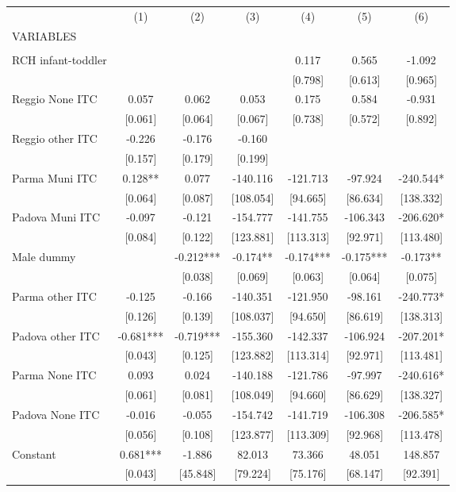 \begin{tabular}{lcccccc} \hline
 & (1) & (2) & (3) & (4) & (5) & (6) \\
VARIABLES &  &  &  &  &  &  \\ \hline
 &  &  &  &  &  &  \\
RCH infant-toddler &  &  &  & 0.117 & 0.565 & -1.092 \\
 &  &  &  & [0.798] & [0.613] & [0.965] \\
Reggio None ITC & 0.057 & 0.062 & 0.053 & 0.175 & 0.584 & -0.931 \\
 & [0.061] & [0.064] & [0.067] & [0.738] & [0.572] & [0.892] \\
Reggio other ITC & -0.226 & -0.176 & -0.160 &  &  &  \\
 & [0.157] & [0.179] & [0.199] &  &  &  \\
Parma Muni ITC & 0.128** & 0.077 & -140.116 & -121.713 & -97.924 & -240.544* \\
 & [0.064] & [0.087] & [108.054] & [94.665] & [86.634] & [138.332] \\
Padova Muni ITC & -0.097 & -0.121 & -154.777 & -141.755 & -106.343 & -206.620* \\
 & [0.084] & [0.122] & [123.881] & [113.313] & [92.971] & [113.480] \\
Male dummy &  & -0.212*** & -0.174** & -0.174*** & -0.175*** & -0.173** \\
 &  & [0.038] & [0.069] & [0.063] & [0.064] & [0.075] \\
Parma other ITC & -0.125 & -0.166 & -140.351 & -121.950 & -98.161 & -240.773* \\
 & [0.126] & [0.139] & [108.037] & [94.650] & [86.619] & [138.313] \\
Padova other ITC & -0.681*** & -0.719*** & -155.360 & -142.337 & -106.924 & -207.201* \\
 & [0.043] & [0.125] & [123.882] & [113.314] & [92.971] & [113.481] \\
Parma None ITC & 0.093 & 0.024 & -140.188 & -121.786 & -97.997 & -240.616* \\
 & [0.061] & [0.081] & [108.049] & [94.660] & [86.629] & [138.327] \\
Padova None ITC & -0.016 & -0.055 & -154.742 & -141.719 & -106.308 & -206.585* \\
 & [0.056] & [0.108] & [123.877] & [113.309] & [92.968] & [113.478] \\
Constant & 0.681*** & -1.886 & 82.013 & 73.366 & 48.051 & 148.857 \\
 & [0.043] & [45.848] & [79.224] & [75.176] & [68.147] & [92.391] \\

\end{tabular}
